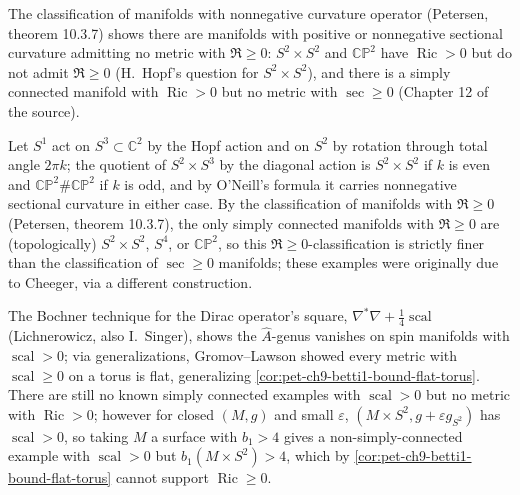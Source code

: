 The classification of manifolds with nonnegative curvature operator (Petersen,
theorem 10.3.7) shows there are manifolds with positive or nonnegative
sectional curvature admitting no metric with $\mathfrak{R}\ge0$: $S^2\times S^2$
and $\mathbb{CP}^2$ have $\operatorname{Ric}>0$ but do not admit $\mathfrak{R}\ge0$ (H.\ Hopf's
question for $S^2\times S^2$), and there is a simply connected manifold with
$\operatorname{Ric}>0$ but no metric with $\sec\ge0$ (Chapter 12 of the source).

\begin{example}[Example 9.4.7]
  \label{ex:pet-ch9-cp2-connect-sum-nonneg-curvature}
  Let $S^1$ act on $S^3\subset\mathbb{C}^2$ by the Hopf action and on $S^2$ by
  rotation through total angle $2\pi k$; the quotient of $S^2\times S^3$ by
  the diagonal action is $S^2\times S^2$ if $k$ is even and
  $\mathbb{CP}^2\#\mathbb{CP}^2$ if $k$ is odd, and by O'Neill's formula it carries
  nonnegative sectional curvature in either case. By the classification of
  manifolds with $\mathfrak{R}\ge0$ (Petersen, theorem 10.3.7), the only simply
  connected manifolds with $\mathfrak{R}\ge0$ are (topologically) $S^2\times S^2$,
  $S^4$, or $\mathbb{CP}^2$, so this $\mathfrak{R}\ge0$-classification is strictly
  finer than the classification of $\sec\ge0$ manifolds; these examples were
  originally due to Cheeger, via a different construction.
\end{example}

The Bochner technique for the Dirac operator's square,
$\nabla^*\nabla+\tfrac14\operatorname{scal}$ (Lichnerowicz, also I.\ Singer), shows the
$\hat A$-genus vanishes on spin manifolds with $\operatorname{scal}>0$; via
generalizations, Gromov--Lawson showed every metric with $\operatorname{scal}\ge0$ on a
torus is flat, generalizing \cref{cor:pet-ch9-betti1-bound-flat-torus}. There
are still no known simply connected examples with $\operatorname{scal}>0$ but no metric
with $\operatorname{Ric}>0$; however for closed $(M,g)$ and small $\varepsilon$,
$(M\times S^2,g+\varepsilon g_{S^2})$ has $\operatorname{scal}>0$, so taking $M$ a surface
with $b_1>4$ gives a non-simply-connected example with $\operatorname{scal}>0$ but
$b_1(M\times S^2)>4$, which by \cref{cor:pet-ch9-betti1-bound-flat-torus}
cannot support $\operatorname{Ric}\ge0$.

